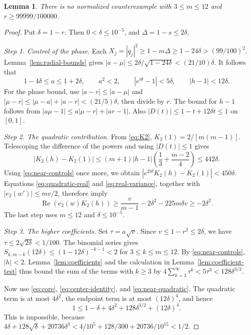 \documentclass[11pt,reqno]{amsart}
\newtheorem{lem}[thm]{Lemma}
\theoremstyle{definition}
\theoremstyle{remark}
\numberwithin{equation}{section}
\newcommand{\Rea}{\operatorname{Re}}
\newcommand{\step}[1]{\par\smallskip\noindent\emph{#1}\enspace}
\begin{document}
\begin{lem}\label{lem:near}
There is no normalized counterexample with $3\le m\le12$ and $r\ge99999/100000$.
\end{lem}
\begin{proof}
Put $\delta=1-r$. Then $0<\delta\le10^{-5}$, and $\Delta=1-s\le2\delta$.

\step{Step 1. Control of the phase.}
Each $X_j=|q_j|^2\ge1-m\Delta\ge1-24\delta>(99/100)^2$.
Lemma~\ref{lem:radial-bounds} gives
$|a-\mu|\le2\delta/\sqrt{1-24\delta}<(21/10)\delta$.
It follows that
\begin{equation}\label{eq:near-controls}
 1-4\delta\le a\le1+2\delta,\qquad
 a^2<2,\qquad |e^{i\theta}-1|<5\delta,\qquad |h-1|<12\delta.
\end{equation}
For the phase bound, use $|a-r|\le|a-\mu|$ and
$|\mu-r|\le|\mu-a|+|a-r|<(21/5)\delta$, then divide by $r$.
The bound for $h-1$ follows from $|a\mu-1|\le a|\mu-r|+|ar-1|$.
Also $|D(t)|\le1-t+12\delta t\le1$ on $[0,1]$.

\step{Step 2. The quadratic contribution.}
From \eqref{eq:K2}, $K_2(1)=2/[m(m-1)]$.
Telescoping the difference of the powers and using $|D(t)|\le1$ gives
\[
 |K_2(h)-K_2(1)|
 \le(m+1)|h-1|\left(\frac13+\frac{m-2}{4}\right)
 \le442\delta.
\]
Using \eqref{eq:near-controls} once more, we obtain
$|e^{2i\theta}K_2(h)-K_2(1)|<450\delta$.
Equations \eqref{eq:quadratic-real} and \eqref{eq:real-variance}, together with $|e_2(w')|\le mv/2$, therefore imply
\begin{equation}\label{eq:near-quadratic}
 \Rea(e_2(w)K_2(h))
 \ge\frac{v}{m-1}-2\delta^2-225m\delta v
 \ge-2\delta^2.
\end{equation}
The last step uses $m\le12$ and $\delta\le10^{-5}$.

\step{Step 3. The higher coefficients.}
Set $\tau=a\sqrt v$. Since $v\le1-r^2\le2\delta$, we have
$\tau\le2\sqrt{2\delta}<1/100$.
The binomial series gives
$S_{k,m-k}(12\delta)\le(1-12\delta)^{-k-1}<2$ for $3\le k\le m\le12$.
By \eqref{eq:near-controls}, $|h|<2$. Lemma~\ref{lem:coefficients} and the calculation in Lemma~\ref{lem:coefficient-test} thus bound the sum of the terms with $k\ge3$ by
$4\sum_{k=3}^{\infty}\tau^k<5\tau^3<128\delta^{3/2}$.

Now use \eqref{eq:core}, \eqref{eq:center-identity}, and \eqref{eq:near-quadratic}. The quadratic term is at most $4\delta^2$, the endpoint term is at most $(12\delta)^4$, and hence
\[
 1\le1-\delta+4\delta^2+128\delta^{3/2}+(12\delta)^4.
\]
This is impossible, because
$4\delta+128\sqrt\delta+20736\delta^3<4/10^5+128/300+20736/10^{15}<1/2$.
\end{proof}
\end{document}
